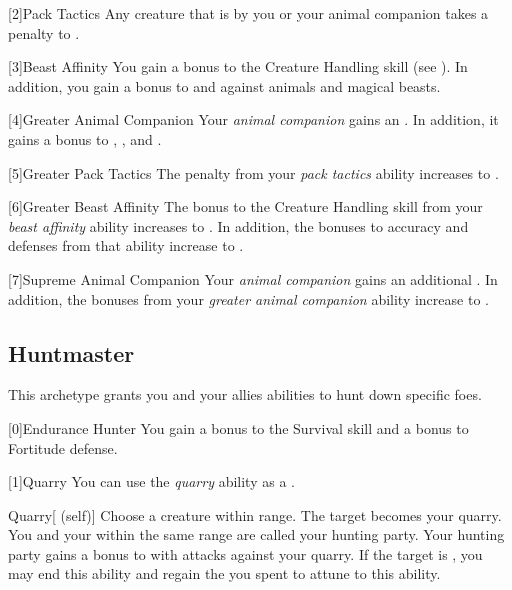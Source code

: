         [2]{Pack Tactics} Any  creature that is  by you or your animal companion takes a  penalty to .

        [3]{Beast Affinity} You gain a  bonus to the Creature Handling skill (see ).
        In addition, you gain a  bonus to  and  against animals and magical beasts.

        [4]{Greater Animal Companion} Your \textit{animal companion} gains an .
        In addition, it gains a  bonus to , , and .

        [5]{Greater Pack Tactics} The penalty from your \textit{pack tactics} ability increases to .

        [6]{Greater Beast Affinity} The bonus to the Creature Handling skill from your \textit{beast affinity} ability increases to .
        In addition, the bonuses to accuracy and defenses from that ability increase to .

        [7]{Supreme Animal Companion} Your \textit{animal companion} gains an additional .
        In addition, the bonuses from your \textit{greater animal companion} ability increase to .

    \newpage
    \subsection{Huntmaster}
        This archetype grants you and your allies abilities to hunt down specific foes.

        [0]{Endurance Hunter} You gain a  bonus to the Survival skill and a  bonus to Fortitude defense.

        [1]{Quarry}\label{Quarry} You can use the \textit{quarry} ability as a .
        \begin{attuneability}{Quarry}[ (self)]
            Choose a creature within \rnglong range.
            The target becomes your quarry.
            You and your  within the same range are called your hunting party.
            Your hunting party gains a  bonus to  with  attacks against your quarry.
            If the target is , you may end this ability and regain the  you spent to attune to this ability.
        \end{attuneability}

